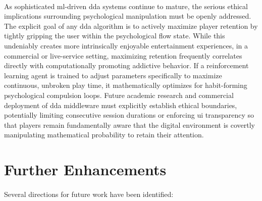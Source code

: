 \paragraph{} As sophisticated \ac{ml}-driven \ac{dda} systems continue to mature, the serious ethical implications surrounding psychological manipulation must be openly addressed. The explicit goal of any \ac{dda} algorithm is to actively maximize player retention by tightly gripping the user within the psychological flow state. While this undeniably creates more intrinsically enjoyable entertainment experiences, in a commercial or live-service setting, maximizing retention frequently correlates directly with computationally promoting addictive behavior. If a reinforcement learning agent is trained to adjust parameters specifically to maximize continuous, unbroken play time, it mathematically optimizes for habit-forming psychological compulsion loops. Future academic research and commercial deployment of \ac{dda} middleware must explicitly establish ethical boundaries, potentially limiting consecutive session durations or enforcing \ac{ui} transparency so that players remain fundamentally aware that the digital environment is covertly manipulating mathematical probability to retain their attention.

\section{Further Enhancements}
\paragraph{} Several directions for future work have been identified:

